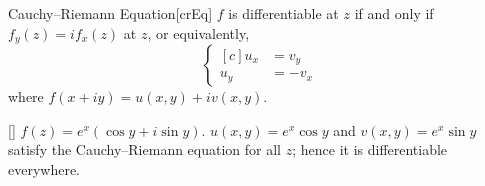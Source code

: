 \documentclass[../complex_variables_1.tex]{subfiles}
\begin{document}
\begin{Theorem}{Cauchy--Riemann Equation}[crEq]
    \(f\) is differentiable at \(z\) if and only if \(f_y(z) = if_x(z)\) at \(z\),
    or equivalently,
    \[
        \left\{\begin{aligned}[c]
                u_x &= v_y \\
                u_y &= -v_x
        \end{aligned}\right.
    \]
    where \(f(x+iy) = u(x,y) + iv(x,y)\).
\end{Theorem}

\begin{Example}{}[]
    \(f(z)= e^x(\cos y + i \sin y)\).
    \(u(x,y) = e^x \cos y\) and \(v(x,y)=e^x \sin y\) satisfy the Cauchy--Riemann equation
    for all \(z\); hence it is differentiable everywhere.
\end{Example}
\end{document}
